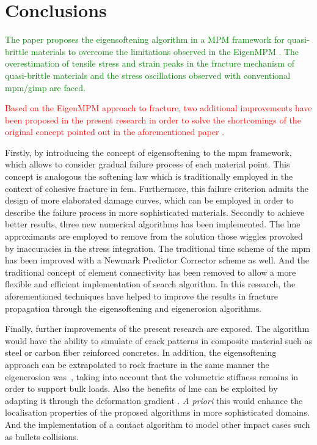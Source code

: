 \documentclass[preprint,12pt,a4paper]{elsarticle}
\newcommand{\PNA}[1]{
  \textcolor{red}{{#1}}
}
\newcommand{\DM}[1]{
  \textcolor{green}{{#1}}
}
\begin{document}
\section{Conclusions}
\label{sec:4}

\DM{The paper proposes the eigensoftening algorithm in a \acrshort{MPM} framework for quasi-brittle materials to overcome the limitations observed in the EigenMPM \cite{Zhang_EE_2020}. The overestimation of tensile 
stress and strain peaks in the fracture mechanism of quasi-brittle
materials and the stress oscillations observed with conventional
\acrshort{mpm}/\acrshort{gimp} are faced.} \PNA{Based on the
EigenMPM approach to fracture, two additional improvements have been proposed in the present research in order to solve the shortcomings of the original concept pointed out in the aforementioned paper \cite{Zhang_EE_2020}.}

Firstly, by introducing the concept of eigensoftening to the \acrshort{mpm} framework,
which allows to consider gradual failure process of each material point. This concept is analogous the softening law which is traditionally employed in the context
of cohesive fracture in \acrshort{fem}. Furthermore, this failure
criterion admits the design of more elaborated damage curves, which
can be employed in order to describe the failure process in more
sophisticated materials. Secondly to achieve better results, three new
numerical algorithms has been implemented. The \acrshort{lme}
approximants are employed to remove from
the solution those wiggles provoked by inaccuracies in the stress
integration. The traditional time scheme of the
\acrshort{mpm} has been improved with a Newmark Predictor Corrector
scheme as well. And the traditional concept of element connectivity
has been removed to allow a more flexible and efficient implementation of search
algorithm. In this research, the aforementioned techniques have helped
to improve the results in fracture propagation through the
eigensoftening and eigenerosion algorithms.

Finally, further improvements of the present research are exposed. The
algorithm would have the ability to simulate of crack patterns in
composite material such as steel or carbon fiber reinforced
concretes\cite{Navas_2018_ES,Ruiz2019}. In addition, the eigensoftening
approach can be extrapolated to rock fracture in the same manner the
eigenerosion was~\cite{Wang2017}, taking into account that the
volumetric stiffness remains in order to support bulk loads. Also the
benefits of \acrshort{lme} can be exploited by adapting it through the
deformation gradient \cite{Kochmann2019}. \textit{A priori} this would
enhance the localisation properties of the proposed algorithms in more
sophisticated domains. And the implementation of a contact algorithm to model other impact cases such as bullets collisions. 
\end{document}
